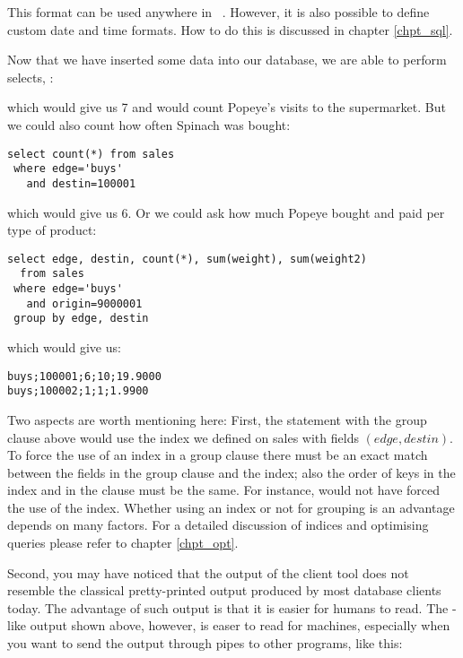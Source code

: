 This format can be used anywhere in \nowdb\ \sql.
However, it is also possible to define custom
date and time formats. How to do this is discussed
in chapter \ref{chpt_sql}.

Now that we have inserted some data
into our database, we are able to perform selects, \eg:



which would give us 7 and would count Popeye's visits to the supermarket.
But we could also count how often Spinach was bought:

\begin{verbatim}
select count(*) from sales
 where edge='buys'
   and destin=100001
\end{verbatim}

which would give us 6.
Or we could ask how much Popeye bought and paid per type of product:

\begin{verbatim}
select edge, destin, count(*), sum(weight), sum(weight2)
  from sales 
 where edge='buys' 
   and origin=9000001 
 group by edge, destin
\end{verbatim}

which would give us:

\begin{verbatim}
buys;100001;6;10;19.9000
buys;100002;1;1;1.9900
\end{verbatim}

Two aspects are worth mentioning here:
First, the statement with the group clause above
would use the index we defined on sales
with fields $(edge, destin)$.
To force the use of an index in a group clause
there must be an exact match between the fields
in the group clause and the index; also the order
of keys in the index and in the clause must be the same.
For instance,  would
not have forced the use of the index.
Whether using an index or not for grouping
is an advantage 
depends on many factors.
For a detailed discussion of indices and
optimising queries please refer to chapter \ref{chpt_opt}.

Second, you may have noticed that the output
of the client tool does not resemble the classical
pretty-printed output produced by most database
clients today. The advantage of such output is
that it is easier for humans to read.
The -like output shown above, however,
is easer to read for machines, especially
when you want to send the output through pipes
to other programs, like this:

